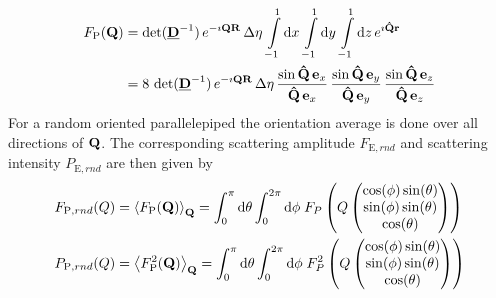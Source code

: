 \begin{align}
F_\mathrm{P}(\B{Q}) &=
\det(\M{D}^{-1})\, e^{-\imath\B{QR}}\, \Delta\eta\, \int\limits_{-1}^1
\mathrm{d}x\, \int\limits_{-1}^{1} \mathrm{d}y\, \int\limits_{-1}^{1} \mathrm{d}z\,
e^{\imath\B{\hat{Q}r}} \nonumber \\
&= \displaystyle
8\, \det(\M{D}^{-1})\, e^{-\imath\B{QR}} \,\Delta\eta\,
\frac{\sin \B{\hat{Q}}\, \B{e}_x}{\B{\hat{Q}}\, \B{e}_x}
\,
\frac{\sin \B{\hat{Q}}\, \B{e}_y}{\B{\hat{Q}}\, \B{e}_y}
\,
\frac{\sin \B{\hat{Q}}\, \B{e}_z}{\B{\hat{Q}}\, \B{e}_z}
\label{eq:form:P}
\end{align}
For a random oriented parallelepiped the orientation average is done over all directions of $\B{Q}$. The corresponding scattering amplitude $F_{\mathrm{E},rnd}$ and scattering intensity $P_{\mathrm{E},rnd}$ are then given by
\begin{align}
F_{\mathrm{P},rnd}(Q) &= \left\langle F_\mathrm{P}(\B{Q})\right\rangle_\B{Q} = \int_0^\pi\mathrm{d}\theta \int_0^{2\pi}\mathrm{d}\phi \; F_P\left(Q\begin{pmatrix}
                                       \cos(\phi)\sin(\theta) \\
                                       \sin(\phi)\sin(\theta) \\
                                       \cos(\theta)
                                     \end{pmatrix}\right) \\
P_{\mathrm{P},rnd}(Q) &= \left\langle F_\mathrm{P}^2(\B{Q})\right\rangle_\B{Q} = \int_0^\pi\mathrm{d}\theta \int_0^{2\pi}\mathrm{d}\phi \; F_P^2\left(Q\begin{pmatrix}
                                       \cos(\phi)\sin(\theta) \\
                                       \sin(\phi)\sin(\theta) \\
                                       \cos(\theta)
                                     \end{pmatrix}\right)
\end{align}

